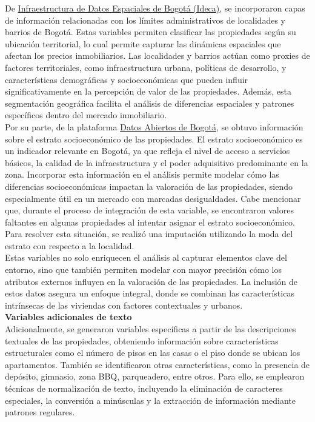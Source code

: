 \documentclass[a4paper]{article}
\theoremstyle{remark}
\theoremstyle{definition}
\begin{document}
De \href{https://www.ideca.gov.co/}{Infraestructura de Datos Espaciales de Bogotá (Ideca)}, se incorporaron capas de información relacionadas con los límites administrativos de localidades y barrios de Bogotá. Estas variables permiten clasificar las propiedades según su ubicación territorial, lo cual permite capturar las dinámicas espaciales que afectan los precios inmobiliarios. Las localidades y barrios actúan como proxies de factores territoriales, como infraestructura urbana, políticas de desarrollo, y características demográficas y socioeconómicas que pueden influir significativamente en la percepción de valor de las propiedades. Además, esta segmentación geográfica facilita el análisis de diferencias espaciales y patrones específicos dentro del mercado inmobiliario.\\

Por su parte, de la plataforma \href{https://datosabiertos.bogota.gov.co/} {Datos Abiertos de Bogotá}, se obtuvo información sobre el estrato socioeconómico de las propiedades. El estrato socioeconómico es un indicador relevante en Bogotá, ya que refleja el nivel de acceso a servicios básicos, la calidad de la infraestructura y el poder adquisitivo predominante en la zona. Incorporar esta información en el análisis permite modelar cómo las diferencias socioeconómicas impactan la valoración de las propiedades, siendo especialmente útil en un mercado con marcadas desigualdades. Cabe mencionar que, durante el proceso de integración de esta variable, se encontraron valores faltantes en algunas propiedades al intentar asignar el estrato socioeconómico. Para resolver esta situación, se realizó una imputación utilizando la moda del estrato con respecto a la localidad. \\

Estas variables no solo enriquecen el análisis al capturar elementos clave del entorno, sino que también permiten modelar con mayor precisión cómo los atributos externos influyen en la valoración de las propiedades. La inclusión de estos datos asegura un enfoque integral, donde se combinan las características intrínsecas de las viviendas con factores contextuales y urbanos.\\

\textbf{Variables adicionales de texto} \\

Adicionalmente, se generaron variables específicas a partir de las descripciones textuales de las propiedades, obteniendo información sobre características estructurales como el número de pisos en las casas o el piso donde se ubican los apartamentos. También se identificaron otras características, como la presencia de depósito, gimnasio, zona BBQ, parqueadero, entre otros. Para ello, se emplearon técnicas de normalización de texto, incluyendo la eliminación de caracteres especiales, la conversión a minúsculas y la extracción de información mediante patrones regulares.\\
\end{document}
